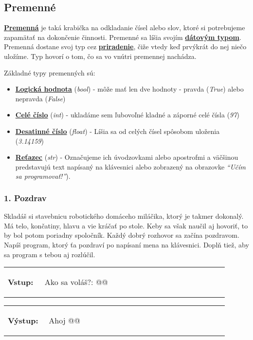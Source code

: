 \subsection{Premenné}
\underline{\textbf{Premenná}} je taká krabička na odkladanie čísel alebo slov, ktoré si potrebujeme zapamätať na dokončenie činnosti. Premenné sa líšia svojím \underline{\textbf{dátovým typom}}. Premenná dostane svoj typ cez \underline{\textbf{priradenie}}, čiže vtedy keď prvýkrát do nej niečo uložíme. Typ hovorí o tom, čo sa vo vnútri premennej nachádza.

Základné typy premenných sú:
\begin{itemize}[noitemsep,topsep=0pt]
\item \underline{\textbf{Logická hodnota}} (\textit{bool}) - môže mať len dve hodnoty - pravda (\textit{True}) alebo nepravda (\textit{False})
\item \underline{\textbf{Celé číslo}} (\textit{int}) - ukladáme sem ľubovoľné kladné a záporné celé čísla (\textit{97})
\item \underline{\textbf{Desatinné číslo}} (\textit{float}) - Líšia sa od celých čísel spôsobom uloženia (\textit{3.14159})
\item \underline{\textbf{Reťazec}} (\textit{str}) - Označujeme ich úvodzovkami alebo apostrofmi a väčšinou predstavujú text napísaný na klávesnici alebo zobrazený na obrazovke \textit{``Učím sa programovať!''}).
\end{itemize}

\subsubsection*{1. Pozdrav}
Skladáš si stavebnicu robotického domáceho miláčika, ktorý je takmer dokonalý. Má telo, končatiny, hlavu a vie kráčať po stole. Keby sa však naučil aj hovoriť, to by bol potom poriadny spoločník. Každý dobrý rozhovor sa začína pozdravom. Napíš program, ktorý ťa pozdraví po napísaní mena na klávesnici. Doplň tiež, aby sa program s tebou aj rozlúčil.

\begin{tabular}{@{}p{0.15\linewidth}p{0.75\linewidth}}
\textbf{\small Vstup:} &
\vspace{-3em}
\begin{code}
Ako sa voláš?: @\fbox{\phantom{meno}}@
\end{code}
\end{tabular}

\vspace{-2em}
\begin{tabular}{@{}p{0.15\linewidth}p{0.75\linewidth}}
\textbf{\small Výstup:} &
\vspace{-3em}
\begin{code}
Ahoj @\fbox{\phantom{meno}}@
\end{code}
\end{tabular}
\vspace{-2em}

